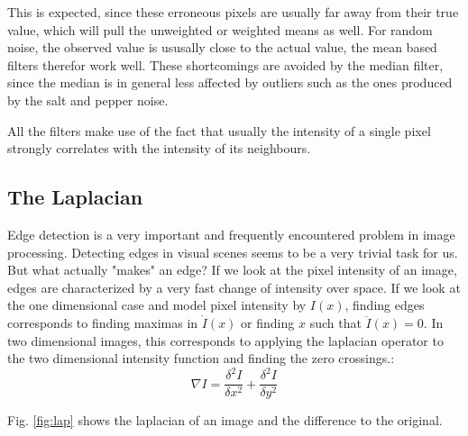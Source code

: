 \documentclass[11pt,a4paper]{article}
\begin{document}
This is expected, since these erroneous pixels are usually far away from their true value, which will pull the unweighted or weighted means as well. For random noise, the observed value is ususally close to the actual value, the mean based filters therefor work well.
These shortcomings are avoided by the median filter, since the median is in general less affected by outliers such as the ones produced by the salt and pepper noise.

All the filters make use of the fact that usually the intensity of a single pixel strongly correlates with the intensity of its neighbours.



\subsection{The Laplacian}
Edge detection is a very important and frequently encountered problem in image processing. Detecting edges in visual scenes seems to be a very trivial task for us. But what actually "makes" an edge? If we look at the pixel intensity of an image, edges are characterized by a very fast change of intensity over space. If we look at the one dimensional case and model pixel intensity by $I(x)$, finding edges corresponds to finding maximas in $\dot{I}(x)$ or finding $x$ such that $\ddot{I}(x) = 0$. In two dimensional images, this corresponds to applying the laplacian operator to the two dimensional intensity function and finding the zero crossings.:
\begin{equation}
\nabla I=\frac{\delta^{2} I}{\delta x^{2}} + \frac{\delta^{2} I}{\delta y^{2}}
\end{equation}

Fig. \ref{fig:lap} shows the laplacian of an image and the difference to the original.
\end{document}
